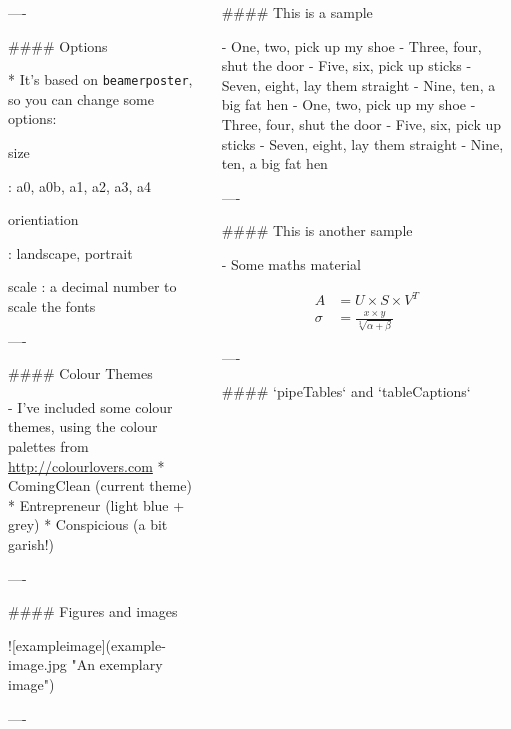 \documentclass{beamer}
\begin{document}
\begin{frame}[fragile]
\begin{columns}[T]
\begin{column}{.46\textwidth}
\begin{markdown}
----


#### Options

* It's based on \texttt{beamerposter}, so you can change some options:

    size
    
    :   a0, a0b, a1, a2, a3, a4

    orientiation
    
    :   landscape, portrait
    
    scale
    :   a decimal number to scale the fonts

----

#### Colour Themes

- I've included some colour themes, using the colour palettes from \url{http://colourlovers.com}
    * ComingClean (current theme)
    * Entrepreneur (light blue + grey)
    * Conspicious (a bit garish!)

---- 

#### Figures and images


![exampleimage](example-image.jpg "An exemplary image")

----

\end{markdown}

\end{column}

\begin{column}{.46\textwidth}

\begin{markdown}

#### This is a sample

- One, two, pick up my shoe
- Three, four, shut the door
- Five, six, pick up sticks
- Seven, eight, lay them straight
- Nine, ten, a big fat hen
- One, two, pick up my shoe
- Three, four, shut the door
- Five, six, pick up sticks
- Seven, eight, lay them straight
- Nine, ten, a big fat hen

----

#### This is another sample

- Some maths material

\begin{align}
A &= U \times S \times V^T\\
\sigma &= \frac{x\times y}{\sqrt[3]{\alpha + \beta}}
\end{align}

----


#### `pipeTables` and `tableCaptions`


\end{markdown}
\end{column}
\end{columns}
\end{frame}
\end{document}
